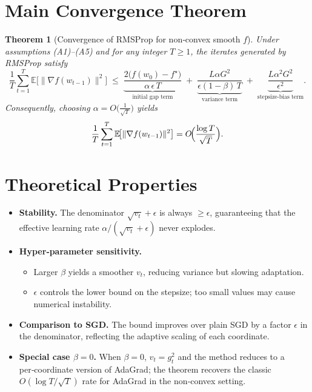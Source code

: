 \documentclass{article}
\newtheorem{theorem}{Theorem}
\newcommand{\EE}{\mathbb{E}}
\begin{document}
\section*{Main Convergence Theorem}
\begin{theorem}[Convergence of RMSProp for non‑convex smooth $f$]\label{thm:main}
Under assumptions (A1)–(A5) and for any integer $T\ge1$, the iterates generated by RMSProp satisfy
\[
\frac{1}{T}\sum_{t=1}^{T}\EE\!\bigl[\|\nabla f(w_{t-1})\|^{2}\bigr]
\;\le\;
\underbrace{\frac{2\bigl(f(w_{0})-f^{\star}\bigr)}{\alpha\,\epsilon\,T}}_{\displaystyle\text{initial gap term}}
\;+\;
\underbrace{\frac{L\alpha G^{2}}{\epsilon(1-\beta)\,T}}_{\displaystyle\text{variance term}}
\;+\;
\underbrace{\frac{L\alpha^{2}G^{2}}{\epsilon^{2}}}_{\displaystyle\text{stepsize‑bias term}} .
\]
Consequently, choosing $\alpha=O\!\bigl(\frac{1}{\sqrt{T}}\bigr)$ yields
\[
\frac{1}{T}\sum_{t=1}^{T}\EE\!\bigl[\|\nabla f(w_{t-1})\|^{2}\bigr] = O\!\Bigl(\frac{\log T}{\sqrt{T}}\Bigr).
\]
\end{theorem}

\section*{Theoretical Properties}
\begin{itemize}
\item \textbf{Stability.} The denominator $\sqrt{v_{t}}+\epsilon$ is always $\ge\epsilon$, guaranteeing that the effective learning rate $\alpha/(\sqrt{v_{t}}+\epsilon)$ never explodes.
\item \textbf{Hyper‑parameter sensitivity.}
    \begin{itemize}
        \item Larger $\beta$ yields a smoother $v_{t}$, reducing variance but slowing adaptation.
        \item $\epsilon$ controls the lower bound on the stepsize; too small values may cause numerical instability.
    \end{itemize}
\item \textbf{Comparison to SGD.} The bound improves over plain SGD by a factor $\epsilon$ in the denominator, reflecting the adaptive scaling of each coordinate.
\item \textbf{Special case $\beta=0$.} When $\beta=0$, $v_{t}=g_{t}^{2}$ and the method reduces to a per‑coordinate version of AdaGrad; the theorem recovers the classic $O(\log T/\sqrt{T})$ rate for AdaGrad in the non‑convex setting.
\end{itemize}
\end{document}
